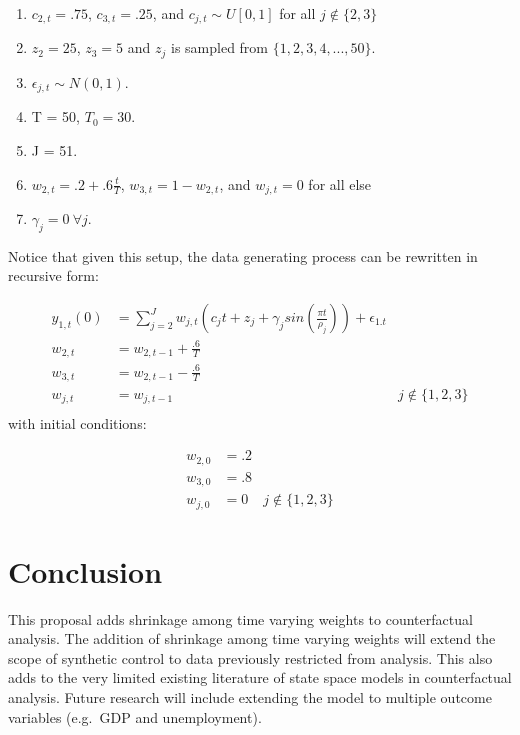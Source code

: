 \documentclass[
]{article}
\begin{document}
\begin{enumerate}
\def\labelenumi{\arabic{enumi})}
\item
  \(c_{2,t}=.75\), \(c_{3,t}=.25\), and \(c_{j,t} \sim U[0,1]\) for all
  \(j \notin \{2,3\}\)
\item
  \(z_2=25\), \(z_3=5\) and \(z_j\) is sampled from
  \(\{1,2,3,4,...,50\}\).
\item
  \(\epsilon_{j,t} \sim N(0,1)\).
\item
  T = 50, \(T_0=30\).
\item
  J = 51.
\item
  \(w_{2,t}=.2+.6\frac{t}{T}\), \(w_{3,t}=1-w_{2,t}\), and \(w_{j,t}=0\)
  for all else
\item
  \(\gamma_{j}=0\ \forall j\).
\end{enumerate}

Notice that given this setup, the data generating process can be
rewritten in recursive form:

\[
\begin{aligned}
y_{1,t}(0)&=\sum_{j=2}^J w_{j,t}\left( c_j t+z_j +\gamma_j sin\left(\frac{\pi t}{\rho_j}\right) \right)+\epsilon_{1.t}\\
w_{2,t}&=w_{2,t-1}+\frac{.6}{T}\\
w_{3,t}&=w_{2,t-1}-\frac{.6}{T}\\
w_{j,t}&=w_{j,t-1} & j\notin \{1,2,3\}\\
\end{aligned}
\] with initial conditions:

\[
\begin{aligned}
w_{2,0}&=.2\\
w_{3,0}&=.8\\
w_{j,0}&=0 & j\notin \{1,2,3\}
\end{aligned}
\]

\hypertarget{conclusion}{%
\section{Conclusion}\label{conclusion}}

This proposal adds shrinkage among time varying weights to
counterfactual analysis. The addition of shrinkage among time varying
weights will extend the scope of synthetic control to data previously
restricted from analysis. This also adds to the very limited existing
literature of state space models in counterfactual analysis. Future
research will include extending the model to multiple outcome variables
(e.g.~GDP and unemployment).
\end{document}
